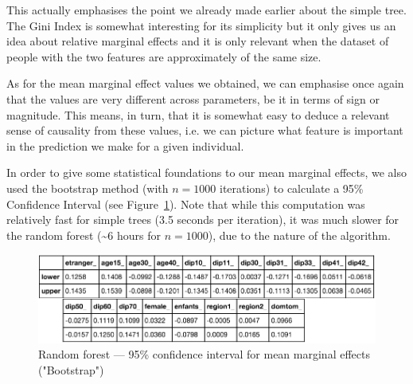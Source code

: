 This actually emphasises the point we already made earlier about the simple tree. The Gini Index is somewhat interesting for its simplicity but it only gives us an idea about relative marginal effects and it is only relevant when the dataset of people with the two features are approximately of the same size.

As for the mean marginal effect values we obtained,  we can emphasise once again that the values are very different across parameters, be it in terms of sign or magnitude. This means, in turn, that it is somewhat easy to deduce a relevant sense of causality from these values, i.e. we can picture what feature is important in the prediction we make for a given individual.

In order to give some statistical foundations to our mean marginal effects, we also used the bootstrap method (with $n=1000$ iterations) to calculate a 95\% Confidence Interval (see Figure~\ref{fig:random_forest_bootstrap}). Note that while this computation was relatively fast for simple trees (3.5 seconds per iteration), it was much slower for the random forest (\textasciitilde6 hours for $n=1000$), due to the nature of the algorithm.

\begin{figure}
    \centering
    \includegraphics[scale=0.25]{img/random_forest_bootstrap.png}
    \caption{Random forest --- 95\% confidence interval for mean marginal effects ("Bootstrap")}
    \label{fig:random_forest_bootstrap}
\end{figure}


